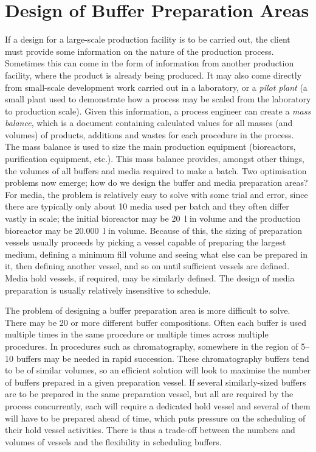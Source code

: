 \section{Design of Buffer Preparation Areas}\label{SS.buffprepdes}

If a design for a large-scale production facility is to be carried out, the
client must provide some information on the nature of the production process.
Sometimes this can come in the form of information from another production
facility, where the product is already being produced. 
It may also come directly from small-scale development work carried out in a
laboratory, or a \emph{pilot plant} (a small plant used to demonstrate how a
process may be scaled from the laboratory to production scale).
Given this information, a process engineer can create a \emph{mass balance}, 
which is a document containing calculated values for all masses (and volumes)
of products, additions and wastes for each procedure in the process.
The mass balance is used to size the main production equipment (bioreactors,
purification equipment, etc.).
This mass balance provides, amongst other things, the volumes of all buffers
and media required to make a batch.
Two optimisation problems now emerge; how do we design the buffer and media
preparation areas?
For media, the problem is relatively easy to solve with some trial and error,
since there are typically only about 10 media used per batch and they often
differ vastly in scale; the initial bioreactor may be \SI{20}{\litre} in volume
and the production bioreactor may be \SI{20,000}{\litre} in volume.
Because of this, the sizing of preparation vessels usually proceeds by picking
a vessel capable of preparing the largest medium, defining a minimum fill
volume and seeing what else can be prepared in it, then defining another
vessel, and so on until sufficient vessels are defined.
Media hold vessels, if required, may be similarly defined.
The design of media preparation is usually relatively insensitive to schedule.

The problem of designing a buffer preparation area is more difficult to solve.
There may be 20 or more different buffer compositions.
Often each buffer is used multiple times in the same procedure or multiple
times across multiple procedures.
In procedures such as chromatography, somewhere in the region of 
\numrange[range-phrase=--]{5}{10} buffers may be needed in rapid succession.
These chromatography buffers tend to be of similar volumes, so an efficient
solution will look to maximise the number of buffers prepared in a given
preparation vessel.
If several similarly-sized buffers are to be prepared in the same preparation
vessel, but all are required by the process concurrently, each will require a
dedicated hold vessel and several of them will have to be prepared ahead of
time, which puts pressure on the scheduling of their hold vessel activities.
There is thus a trade-off between the numbers and volumes of vessels and
the flexibility in scheduling buffers.

